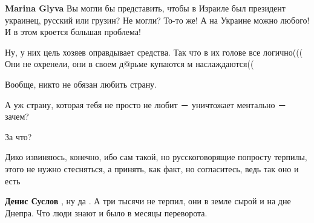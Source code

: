 \begin{itemize}
\begin{itemize}
\textbf{Marina Glyva} Вы могли бы представить, чтобы в Израиле был президент
украинец, русский или грузин? Не могли? То-то же! А на Украине можно любого! И в
этом кроется большая проблема!
\end{itemize}

 

Ну, у них цель хозяев оправдывает средства. Так что в их голове все логично(((
Они не охренели, они в своем д@рьме купаются м наслаждаются((


 
Вообще, никто не обязан любить страну.

А уж страну, которая тебя не просто не любит － уничтожает ментально － зачем?

За что?

 

Дико извиняюсь, конечно, ибо сам такой, но русскоговорящие попросту терпилы,
этого не нужно стесняться, а принять, как факт, но согласитесь, ведь так оно и
есть

\begin{itemize}
 
\textbf{Денис Суслов} , ну да . А три тысячи не терпил, они в земле сырой и на дне Днепра. Что люди знают и было в месяцы переворота.

 

\end{itemize}
\end{itemize}
